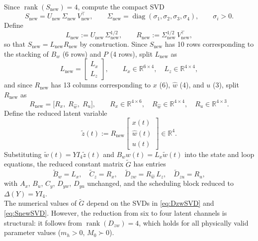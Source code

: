 \documentclass[11pt]{article}
\newcommand{\R}{\mathbb{R}}
\newcommand{\diag}{\operatorname{diag}}
\newcommand{\rank}{\operatorname{rank}}
\begin{document}
Since $\rank(S_{\mathrm{new}}) = 4$, compute the compact SVD
\begin{equation}
    S_{\mathrm{new}} = U_{\mathrm{new}}\,\Sigma_{\mathrm{new}}\,V_{\mathrm{new}}^\top,
    \qquad
    \Sigma_{\mathrm{new}} = \diag(\sigma_1, \sigma_2, \sigma_3, \sigma_4),
    \qquad
    \sigma_i > 0.
    \label{eq:SnewSVD}
\end{equation}
Define
\begin{equation}
    L_{\mathrm{new}} := U_{\mathrm{new}}\,\Sigma_{\mathrm{new}}^{1/2},
    \qquad
    R_{\mathrm{new}} := \Sigma_{\mathrm{new}}^{1/2}\,V_{\mathrm{new}}^\top,
    \label{eq:LRnew}
\end{equation}
so that $S_{\mathrm{new}} = L_{\mathrm{new}} R_{\mathrm{new}}$ by construction.
Since $S_{\mathrm{new}}$ has 10 rows corresponding to the stacking of $B_w$
(6 rows) and $P$ (4 rows), split $L_{\mathrm{new}}$ as
\begin{equation}
    L_{\mathrm{new}} =
    \begin{bmatrix} L_x \\ L_z \end{bmatrix},
    \qquad L_x \in \R^{6\times 4},\quad L_z \in \R^{4\times 4},
    \label{eq:Lsplit}
\end{equation}
and since $R_{\mathrm{new}}$ has 13 columns corresponding to $x$ (6), $\hat{w}$
(4), and $u$ (3), split $R_{\mathrm{new}}$ as
\begin{equation}
    R_{\mathrm{new}} = \bigl[R_x,\; R_{\hat{w}},\; R_u\bigr],
    \qquad R_x \in \R^{4\times 6},\quad R_{\hat{w}} \in \R^{4\times 4},
    \quad R_u \in \R^{4\times 3}.
    \label{eq:Rsplit}
\end{equation}
Define the reduced latent variable
\begin{equation}
    \tilde{z}(t)
    := R_{\mathrm{new}}
    \begin{bmatrix}
        x(t) \\ \hat{w}(t) \\ u(t)
    \end{bmatrix}
    \in \R^4.
    \label{eq:ztilde2}
\end{equation}
Substituting $\tilde{w}(t) = YI_4\tilde{z}(t)$ and $B_w w(t) = L_x \tilde{w}(t)$
into the state and loop equations, the reduced constant matrix $\tilde{G}$ has 
entries
\begin{equation}
    \tilde{B}_w = L_x,\quad
    \tilde{C}_z = R_x,\quad
    \tilde{D}_{zw} = R_{\hat{w}}\, L_z,\quad
    \tilde{D}_{zu} = R_u,
    \label{eq:Gtilde2}
\end{equation}
with $A_x$, $B_u$, $C_y$, $D_{yw}$, $D_{yu}$ unchanged, and the scheduling
block reduced to $\Delta(Y) = Y I_4$.
\\
The numerical values of $\tilde{G}$ depend on the SVDs in \eqref{eq:DzwSVD}
and \eqref{eq:SnewSVD}. However, the reduction from six to four latent channels
is structural: it follows from $\rank(D_{zw}) = 4$, which holds for all
physically valid parameter values ($m_h > 0$, $M_0 \succ 0$).
\end{document}
